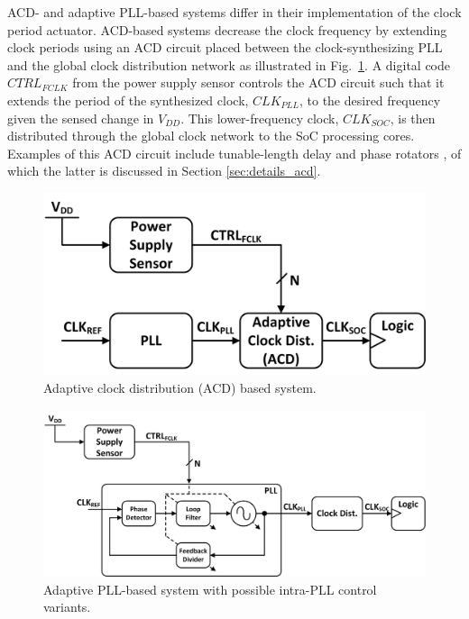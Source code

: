 \documentclass[twoside,9pt,journal,letterpage]{IEEEtran}
\begin{document}
ACD- and adaptive PLL-based systems differ in their implementation of the clock period actuator. ACD-based systems decrease the clock frequency by extending clock periods using an ACD circuit placed between the clock-synthesizing PLL and the global clock distribution network as illustrated in Fig.\ \ref{fig:overview_acd}. A digital code $CTRL_{FCLK}$ from the power supply sensor controls the ACD circuit such that it extends the period of the synthesized clock, $CLK_{PLL}$, to the desired frequency given the sensed change in $V_{DD}$. This lower-frequency clock, $CLK_{SOC}$, is then distributed through the global clock network to the SoC processing cores. Examples of this ACD circuit include tunable-length delay \cite{bowman2016} and phase rotators \cite{wilcox2015}, of which the latter is discussed in Section \ref{sec:details_acd}.

\begin{figure}[h]
	\centering
	\includegraphics[width=0.7\columnwidth]{fig_overview_acd}
	\caption{Adaptive clock distribution (ACD) based system.}
	\label{fig:overview_acd}
\end{figure}

\begin{figure}[h]
	\centering
	\includegraphics[width=\columnwidth]{fig_overview_pll}
	\caption{Adaptive PLL-based system with possible intra-PLL control variants.}
	\label{fig:overview_pll}
\end{figure}
\end{document}
